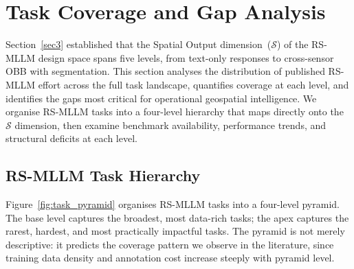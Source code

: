 
\section{Task Coverage and Gap Analysis}\label{sec4}

Section~\ref{sec3} established that the Spatial Output dimension~($\mathcal{S}$)
of the RS-MLLM design space spans five levels, from text-only responses to
cross-sensor OBB with segmentation. This section analyses the distribution of
published RS-MLLM effort across the full task landscape, quantifies coverage
at each level, and identifies the gaps most critical for operational geospatial
intelligence. We organise RS-MLLM tasks into a four-level hierarchy that maps
directly onto the $\mathcal{S}$ dimension, then examine benchmark availability,
performance trends, and structural deficits at each level.

\subsection{RS-MLLM Task Hierarchy}\label{sec4:hierarchy}

Figure~\ref{fig:task_pyramid} organises RS-MLLM tasks into a four-level pyramid.
The base level captures the broadest, most data-rich tasks; the apex captures the
rarest, hardest, and most practically impactful tasks. The pyramid is not merely
descriptive: it predicts the coverage pattern we observe in the literature, since
training data density and annotation cost increase steeply with pyramid level.

